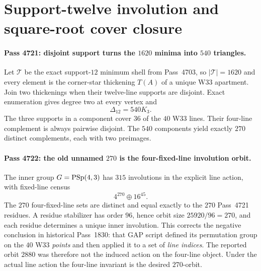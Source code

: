 \section*{Support-twelve involution and square-root cover closure}

\paragraph{Pass 4721: disjoint support turns the $1620$ minima into $540$ triangles.}
Let $\mathcal T$ be the exact support-$12$ minimum shell from Pass~4703, so
$|\mathcal T|=1620$ and every element is the corner-star thickening $T(A)$ of a
unique W33 apartment.  Join two thickenings when their twelve-line supports are
disjoint.  Exact enumeration gives degree two at every vertex and
\[
 \boxed{\Delta_{12}=540K_3.}
\]
The three supports in a component cover $36$ of the $40$ W33 lines.  Their
four-line complement is always pairwise disjoint.  The $540$ components yield
exactly $270$ distinct complements, each with two preimages.

\paragraph{Pass 4722: the old unnamed $270$ is the four-fixed-line involution orbit.}
The inner group $G=\mathrm{PSp}(4,3)$ has $315$ involutions in the explicit line action,
with fixed-line census
\[
 \boxed{4^{270}\oplus16^{45}.}
\]
The $270$ four-fixed-line sets are distinct and equal exactly to the $270$
Pass~4721 residues.  A residue stabilizer has order $96$, hence orbit size
$25920/96=270$, and each residue determines a unique inner involution.
This corrects the negative conclusion in historical Pass~1830: that GAP script
defined its permutation group on the $40$ W33 \emph{points} and then applied it
to a set of \emph{line indices}.  The reported orbit $2880$ was therefore not
the induced action on the four-line object.  Under the actual line action the
four-line invariant is the desired $270$-orbit.

